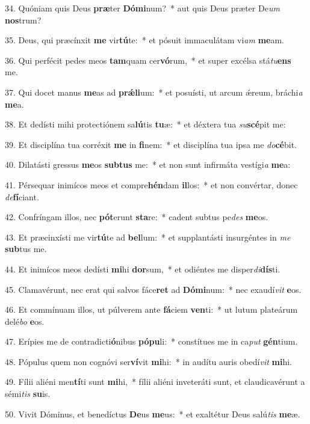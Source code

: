 34. Quóniam quis Deus \textbf{præ}ter \textbf{Dó}\textbf{mi}num?~*  aut quis Deus præter De\textit{um} \textbf{nos}trum?\

35. Deus, qui præcínxit \textbf{me} vir\textbf{tú}te:~*  et pósuit immaculátam vi\textit{am} \textbf{me}am.\

36. Qui perfécit pedes meos \textbf{tam}quam cer\textbf{vó}rum,~*  et super excélsa stá\textit{tu}\textbf{ens} me.\

37. Qui docet manus \textbf{me}as ad \textbf{prǽ}\textbf{li}um:~*  et posuísti, ut arcum ǽreum, bráchi\textit{a} \textbf{me}a.\

38. Et dedísti mihi protectiónem sa\textbf{lú}tis \textbf{tu}æ:~*  et déxtera tua \textit{su}\textbf{scé}pit me:\

39. Et disciplína tua corréxit \textbf{me} in \textbf{fi}nem:~*  et disciplína tua ipsa me \textit{do}\textbf{cé}bit.\

40. Dilatásti gressus \textbf{me}os \textbf{sub}\textbf{tus} me:~*  et non sunt infirmáta vestígi\textit{a} \textbf{me}a:\

41. Pérsequar inimícos meos et compre\textbf{hén}dam \textbf{il}los:~*  et non convértar, donec \textit{de}\textbf{fí}ciant.\

42. Confríngam illos, nec \textbf{pót}erunt \textbf{sta}re:~*  cadent subtus pe\textit{des} \textbf{me}os.\

43. Et præcinxísti me vir\textbf{tú}te ad \textbf{bel}lum:~*  et supplantásti insurgéntes in \textit{me} \textbf{sub}tus me.\

44. Et inimícos meos dedísti \textbf{mi}hi \textbf{dor}sum,~*  et odiéntes me disper\textit{di}\textbf{dís}ti.\

45. Clamavérunt, nec erat qui salvos fáce\textbf{ret} ad \textbf{Dó}\textbf{mi}num:~*  nec exaudí\textit{vit} \textbf{e}os.\

46. Et commínuam illos, ut púlverem ante \textbf{fá}ciem \textbf{ven}ti:~*  ut lutum plateárum delé\textit{bo} \textbf{e}os.\

47. Erípies me de contradicti\textbf{ó}nibus \textbf{pó}\textbf{pu}li:~*  constítues me in ca\textit{put} \textbf{gén}tium.\

48. Pópulus quem non cognóvi ser\textbf{ví}vit \textbf{mi}hi:~*  in audítu auris obedí\textit{vit} \textbf{mi}hi.\

49. Fílii aliéni men\textbf{tí}ti sunt \textbf{mi}hi,~*  fílii aliéni inveteráti sunt, et claudicavérunt a sémi\textit{tis} \textbf{su}is.\

50. Vivit Dóminus, et benedíctus \textbf{De}us \textbf{me}us:~*  et exaltétur Deus salú\textit{tis} \textbf{me}æ.\

